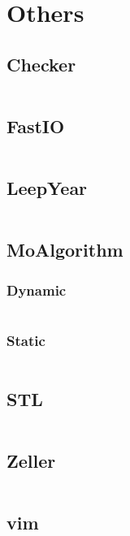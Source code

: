 \documentclass[a4paper,11pt]{article}
\begin{document}
\newpage
\section{Others}
\subsection{Checker}
\inputminted[breaklines]{c++}{Others/+Checker.cpp}
\subsection{FastIO}
\inputminted[breaklines]{c++}{Others/+FastIO.cpp}
\subsection{LeepYear}
\inputminted[breaklines]{c++}{Others/+LeepYear.cpp}
\subsection{MoAlgorithm}
\subsubsection{Dynamic}
\inputminted[breaklines]{c++}{Others/+MoAlgorithm/+Dynamic.cpp}
\subsubsection{Static}
\inputminted[breaklines]{c++}{Others/+MoAlgorithm/+Static.cpp}

\subsection{STL}
\inputminted[breaklines]{c++}{Others/+STL.cpp}
\subsection{Zeller}
\inputminted[breaklines]{c++}{Others/+Zeller.cpp}
\subsection{vim}
\inputminted[breaklines]{c++}{Others/+vim.vim}

\newpage
\end{document}
